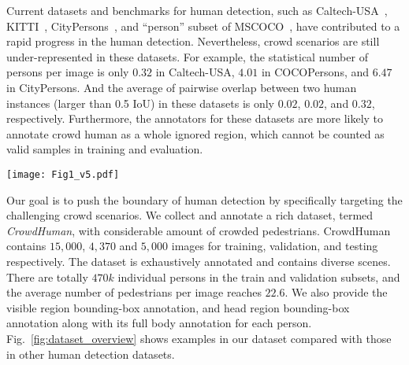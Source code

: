 \documentclass[10pt,twocolumn,letterpaper]{article}
\begin{document}
Current datasets and benchmarks for human detection, such as Caltech-USA~\cite{dollar2009pedestrian}, KITTI~\cite{Geiger2012CVPR}, CityPersons~\cite{zhang2017citypersons}, and ``person'' subset of MSCOCO~\cite{lin2014microsoft}, have contributed to a rapid progress in the human detection. Nevertheless, crowd scenarios are still under-represented in these datasets. For example, the statistical number of persons per image is only $0.32$ in Caltech-USA, $4.01$ in COCOPersons, and $6.47$ in CityPersons.  And the average of pairwise overlap between two human instances (larger than 0.5 IoU) in these datasets is only $0.02$, $0.02$, and $0.32$, respectively. Furthermore, the annotators for these datasets are more likely to annotate crowd human as a whole ignored region, which cannot be counted as valid samples in training and evaluation.


\begin{figure*}[thp]
\centering
\texttt{[image: Fig1\_v5.pdf]}
\caption{Illustrative examples from different human dataset benchmarks. The images inside the green, yellow, blue boxes are from the COCO~\cite{lin2014microsoft}, Caltech~\cite{dollar2009pedestrian}, and CityPersons~\cite{zhang2017citypersons} datasets, respectively. The images from the second row inside the red box are from our CrowdHuman benchmark with full body, visible body, and head bounding box annotations for each person.}
\label{fig:dataset_overview}
\end{figure*}


Our goal is to push the boundary of human detection by specifically targeting the challenging crowd scenarios. We collect and annotate a rich dataset,  termed \emph{CrowdHuman}, with considerable amount of crowded pedestrians. CrowdHuman contains $15,000$, $4,370$ and $5,000$ images for training, validation, and testing respectively. The dataset is exhaustively annotated and contains diverse scenes. There are totally $470k$ individual persons in the train and validation subsets, and the average number of pedestrians per image reaches $22.6$. We also provide the visible region bounding-box annotation, and head region bounding-box annotation along with its full body annotation for each person. Fig.~\ref{fig:dataset_overview} shows examples in our dataset compared with those in other human detection datasets.
\end{document}
